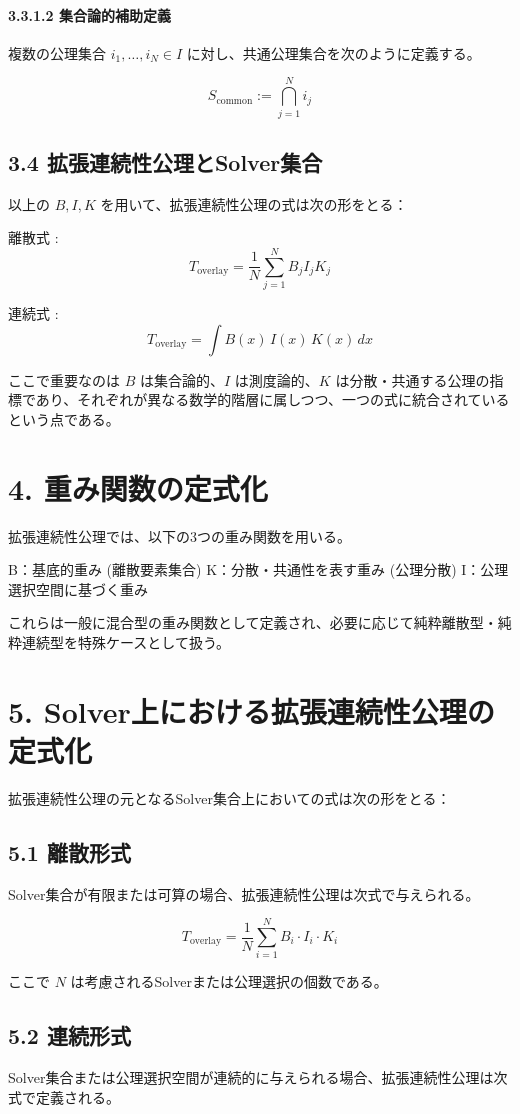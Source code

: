 \documentclass[12pt,a4paper]{article}
\begin{document}
\paragraph{3.3.1.2 集合論的補助定義}
複数の公理集合 $i_1,\dots,i_N\in I$ に対し、共通公理集合を次のように定義する。

\[
S_{\mathrm{common}} := \bigcap_{j=1}^N i_j
\]

\subsection*{3.4 拡張連続性公理とSolver集合}

以上の $B,I,K$ を用いて、拡張連続性公理の式は次の形をとる：

離散式 : 
\[
T_{\mathrm{overlay}} = \frac{1}{N}\sum_{j=1}^N B_j I_j K_j
\]

連続式 : 
\[
T_{\mathrm{overlay}} = \int B(x)\,I(x)\,K(x)\,dx
\]

ここで重要なのは $B$ は集合論的、$I$ は測度論的、$K$ は分散・共通する公理の指標であり、それぞれが異なる数学的階層に属しつつ、一つの式に統合されているという点である。

\section{4. 重み関数の定式化}
拡張連続性公理では、以下の3つの重み関数を用いる。

B：基底的重み (離散要素集合)
K：分散・共通性を表す重み (公理分散)
I：公理選択空間に基づく重み

これらは一般に混合型の重み関数として定義され、必要に応じて純粋離散型・純粋連続型を特殊ケースとして扱う。

\section{5. Solver上における拡張連続性公理の定式化}
拡張連続性公理の元となるSolver集合上においての式は次の形をとる：

\subsection{5.1 離散形式}
Solver集合が有限または可算の場合、拡張連続性公理は次式で与えられる。

\[
T_{\mathrm{overlay}} = \frac{1}{N} \sum_{i=1}^{N} B_i \cdot I_i \cdot K_i
\]

ここで $N$ は考慮されるSolverまたは公理選択の個数である。

\subsection{5.2 連続形式}
Solver集合または公理選択空間が連続的に与えられる場合、拡張連続性公理は次式で定義される。
\end{document}
